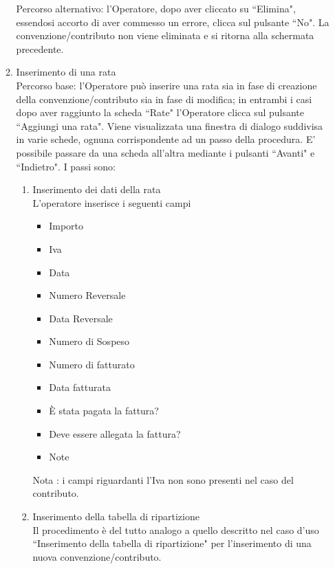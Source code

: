 \begin{enumerate}
\begin{enumerate}
  Percorso alternativo:
  l'Operatore, dopo aver cliccato su ``Elimina", essendosi accorto di aver commesso un errore, clicca sul pulsante ``No". La convenzione/contributo non viene eliminata e si ritorna alla schermata precedente.
  
  
  
\item Inserimento di una rata\\ \label{UC_new_installment}
Percorso base:
l'Operatore può inserire una rata sia in fase di creazione della convenzione/contributo sia in fase di modifica; in entrambi i casi dopo aver raggiunto
la scheda ``Rate" l'Operatore clicca sul pulsante ``Aggiungi una rata".  
Viene visualizzata una finestra di dialogo suddivisa in varie schede,
ognuna corrispondente ad un passo della procedura. E' possibile passare da una scheda all'altra mediante i pulsanti \textquotedblleft Avanti" e \textquotedblleft Indietro". I passi sono:
\begin{enumerate}
  \item Inserimento dei dati della rata\\
  
  L'operatore inserisce i seguenti campi
    \begin{itemize}
    \item Importo
    \item Iva
    \item Data
    \item Numero Reversale
    \item Data Reversale
    \item Numero di Sospeso
    \item Numero di fatturato
    \item Data fatturata
    \item È stata pagata la fattura?
    \item Deve essere allegata la fattura?
    \item Note
    \end{itemize}
    
   Nota : i campi riguardanti l'Iva non sono presenti nel caso del contributo.

   
  \item Inserimento della tabella di ripartizione\\
  
  Il procedimento è del tutto analogo a quello descritto nel caso d'uso \textquotedblleft Inserimento della tabella di ripartizione" per l'inserimento di 
  una nuova convenzione/contributo. 
\end{enumerate}


\end{enumerate}
\end{enumerate}

